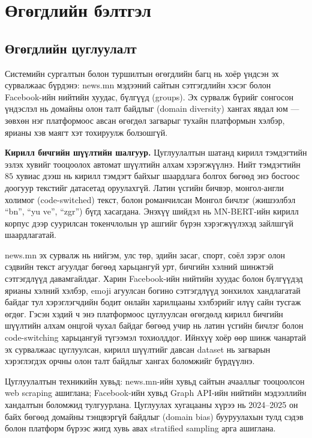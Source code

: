 
\chapter{Өгөгдлийн бэлтгэл}
\label{Chapter2}

\section{Өгөгдлийн цуглуулалт}

Системийн сургалтын болон туршилтын өгөгдлийн багц нь хоёр үндсэн эх
сурвалжаас бүрдэнэ: news.mn мэдээний сайтын сэтгэгдлийн хэсэг болон
Facebook-ийн нийтийн хуудас, бүлгүүд (groups). Эх сурвалж бүрийг сонгосон
үндэслэл нь домайны олон талт байдлыг (domain diversity) хангах явдал юм ---
зөвхөн нэг платформоос авсан өгөгдөл загварыг тухайн платформын хэлбэр, ярианы
хэв маягт хэт тохируулж болзошгүй.

\textbf{Кирилл бичгийн шүүлтийн шалгуур.} Цуглуулалтын шатанд кирилл
тэмдэгтийн эзлэх хувийг тооцоолох автомат шүүлтийн алхам хэрэгжүүлнэ. Нийт
тэмдэгтийн $85$ хувиас дээш нь кирилл тэмдэгт байхыг шаардлага болгох бөгөөд
энэ босгоос доогуур текстийг датасетад оруулахгүй. Латин үсгийн бичвэр,
монгол-англи холимог (code-switched) текст, болон романчилсан Монгол бичлэг
(жишээлбэл ``bn'', ``yu ve'', ``zgr'') бүгд хасагдана. Энэхүү шийдэл нь
MN-BERT-ийн кирилл корпус дээр суурилсан токенчлолын үр ашгийг бүрэн
хэрэгжүүлэхэд зайлшгүй шаардлагатай.

news.mn эх сурвалж нь нийгэм, улс төр, эдийн засаг, спорт, соёл зэрэг олон
сэдвийн текст агуулдаг бөгөөд харьцангуй урт, бичгийн хэлний шинжтэй
сэтгэгдлүүд давамгайлдаг. Харин Facebook-ийн нийтийн хуудас болон бүлгүүдэд
ярианы хэлний хэлбэр, emoji агуулсан богино сэтгэгдлүүд зонхилох хандлагатай
байдаг тул хэрэглэгчдийн бодит онлайн харилцааны хэлбэрийг илүү сайн тусгаж
өгдөг. Гэсэн хэдий ч энэ платформоос цуглуулсан өгөгдөлд кирилл бичгийн
шүүлтийн алхам онцгой чухал байдаг бөгөөд учир нь латин үсгийн бичлэг болон
code-switching харьцангуй түгээмэл тохиолддог. Ийнхүү хоёр өөр шинж чанартай
эх сурвалжаас цуглуулсан, кирилл шүүлтийг давсан dataset нь загварын хэрэглэгдэх
орчны олон талт байдлыг хангах боломжийг бүрдүүлнэ.

Цуглуулалтын техникийн хувьд: news.mn-ийн хувьд сайтын ачааллыг тооцоолсон
web scraping ашиглана; Facebook-ийн хувьд Graph API-ийн нийтийн мэдээллийн
хандалтын боломжид тулгуурлана. Цуглуулах хугацааны хүрээ нь 2024--2025 он
байх бөгөөд домайны тэнцвэргүй байдлыг (domain bias) бууруулахын тулд сэдэв
болон платформ бүрээс жигд хувь авах stratified sampling арга ашиглана.

